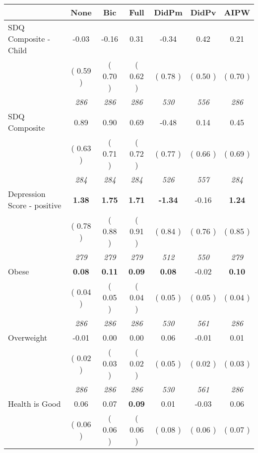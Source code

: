 \begin{tabular}{l c c c c c c}
\toprule
 & None & Bic & Full & DidPm & DidPv & AIPW \\
\midrule
SDQ Composite - Child &     -0.03 &     -0.16 &      0.31 &     -0.34 &      0.42 &      0.21 \\
& (     0.59 ) & (     0.70 ) & (     0.62 ) & (     0.78 ) & (     0.50 ) & (     0.70 ) \\
& \textit{ 286 } & \textit{ 286 } & \textit{ 286 } & \textit{ 530 } & \textit{ 556 } & \textit{ 286 } \\
SDQ Composite &      0.89 &      0.90 &      0.69 &     -0.48 &      0.14 &      0.45 \\
& (     0.63 ) & (     0.71 ) & (     0.72 ) & (     0.77 ) & (     0.66 ) & (     0.69 ) \\
& \textit{ 284 } & \textit{ 284 } & \textit{ 284 } & \textit{ 526 } & \textit{ 557 } & \textit{ 284 } \\
Depression Score - positive & \textbf{      1.38 } & \textbf{      1.75 } & \textbf{      1.71 } & \textbf{     -1.34 } &     -0.16 & \textbf{     1.24} \\
& (     0.78 ) & (     0.88 ) & (     0.91 ) & (     0.84 ) & (     0.76 ) & (     0.85 ) \\
& \textit{ 279 } & \textit{ 279 } & \textit{ 279 } & \textit{ 512 } & \textit{ 550 } & \textit{ 279 } \\
Obese & \textbf{      0.08 } & \textbf{      0.11 } & \textbf{      0.09 } & \textbf{      0.08 } &     -0.02 & \textbf{     0.10} \\
& (     0.04 ) & (     0.05 ) & (     0.04 ) & (     0.05 ) & (     0.05 ) & (     0.04 ) \\
& \textit{ 286 } & \textit{ 286 } & \textit{ 286 } & \textit{ 530 } & \textit{ 561 } & \textit{ 286 } \\
Overweight &     -0.01 &      0.00 &      0.00 &      0.06 &     -0.01 &      0.01 \\
& (     0.02 ) & (     0.03 ) & (     0.02 ) & (     0.05 ) & (     0.02 ) & (     0.03 ) \\
& \textit{ 286 } & \textit{ 286 } & \textit{ 286 } & \textit{ 530 } & \textit{ 561 } & \textit{ 286 } \\
Health is Good &      0.06 &      0.07 & \textbf{      0.09 } &      0.01 &     -0.03 &      0.06 \\
& (     0.06 ) & (     0.06 ) & (     0.06 ) & (     0.08 ) & (     0.06 ) & (     0.07 ) \\

\end{tabular}
